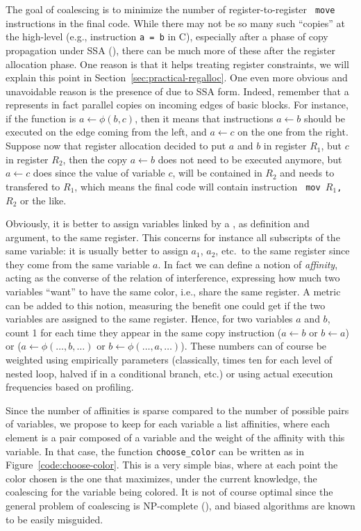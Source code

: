 {The goal of coalescing is to minimize the number of register-to-register {\tt 
move} instructions in the final code. While there may not be so many such 
``copies'' at the high-level (e.g., instruction {\tt a = b} in C), especially 
after a phase of copy propagation under SSA (), there can 
be much more of these after the register allocation phase. One reason is that 
it helps treating register constraints, we will explain this point in 
Section~\ref{sec:practical-regalloc}. One even more obvious and unavoidable 
reason is the presence of \phifuns due to SSA form. Indeed, remember that a 
\phifun represents in fact parallel copies on incoming edges of basic blocks. 
For instance, if the function is $a \gets \phi(b,c)$, then it means that 
instructions $a\gets b$ should be executed on the edge coming from the left, 
and $a\gets c$ on the one from the right. Suppose now that register allocation 
decided to put $a$ and $b$ in register $R_1$, but $c$ in register $R_2$, then 
the copy $a\gets b$ does not need to be executed anymore, but $a\gets c$ does 
since the value of variable $c$, will be contained in $R_2$ and needs to 
transfered to $R_1$, which means the final code will contain instruction {\tt 
mov $R_1$, $R_2$} or the like.

Obviously, it is better to assign variables linked by a \phifun, as definition 
and argument, to the same register. This concerns for instance all subscripts 
of the same variable: it is usually better to assign $a_1$, $a_2$, etc.\ to the 
same register since they come from the same variable $a$. In fact we can define 
a notion of \emph{affinity}, acting as the converse of the relation of 
interference, expressing how much two variables ``want'' to have the same 
color, i.e., share the same register. A metric can be added to this notion, 
measuring the benefit one could get if the two variables are assigned to the 
same register. Hence, for two variables $a$ and $b$, count 1 for each time they 
appear in the same copy instruction ($a\gets b$ or $b\gets a$) or \phifun 
($a\gets\phi(\ldots,b,\ldots)$ or $b\gets\phi(\ldots,a,\ldots)$). These numbers 
can of course be weighted using empirically parameters (classically, times ten 
for each level of nested loop, halved if in a conditional branch, etc.) or 
using actual execution frequencies based on profiling.


Since the number of affinities is sparse compared to the number of possible 
pairs of variables, we propose to keep for each variable a list affinities, 
where each element is a pair composed of a variable and the weight of the 
affinity with this variable. In that case, the function {\tt choose\_color} can 
be written as in Figure~\ref{code:choose-color}. This is a very simple bias, 
where at each point the color chosen is the one that maximizes, under the 
current knowledge, the coalescing for the variable being colored. It is not of 
course optimal since the general problem of coalescing is NP-complete 
(), and biased algorithms are known to be easily misguided.


}
